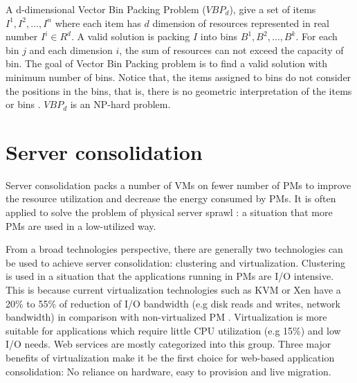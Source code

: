 A d-dimensional Vector Bin Packing Problem ($VBP_d$), give a set of items $I^1, I^2, \dots, I^n$ where each item has $d$ dimension of resources represented in real number $I^i \in R^d$. A valid solution is packing $I$ into bins $B^1, B^2, \dots, B^k$. For each bin $j$ and each dimension $i$, the sum of resources can not exceed the capacity of bin. The goal of Vector Bin Packing problem is to find a valid solution with minimum number of bins. Notice that, the items assigned to bins do not consider the positions in the bins, that is, there is no geometric interpretation of the items or bins \cite{Johnson:2016wp}. $VBP_d$ is an NP-hard problem. 

\section{Server consolidation}

Server consolidation packs a number of VMs on fewer number of PMs to improve the resource utilization and decrease the energy consumed by PMs. It is often applied to solve the problem of physical server sprawl \cite{Khanna:2006vq}: a situation that more PMs are used in a low-utilized way. 



From a broad technologies perspective, there are generally two technologies can be used to achieve server consolidation: clustering and virtualization. Clustering is used in a situation that the applications running in PMs are I/O intensive. This is because current virtualization technologies  such as KVM \cite{Kivity:2007wu} or Xen \cite{Barham:2003cj} have a 20\% to 55\% of reduction of I/O bandwidth (e.g disk reads and writes, network bandwidth) in comparison with non-virtualized PM \cite{Shafer:2010vh}. Virtualization is more suitable for applications which require little CPU utilization (e.g 15\%) and low I/O needs. Web services are mostly categorized into this group. Three major benefits of virtualization make it be the first choice for web-based application consolidation: No reliance on hardware, easy to provision and live migration.

